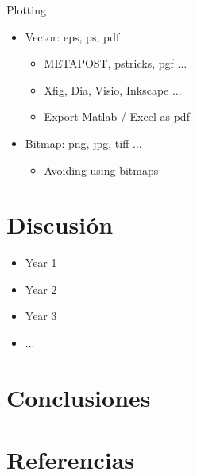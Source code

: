 \documentclass{beamer}
\begin{document}
\begin{frame}{Plotting}
    \begin{itemize}
        \item Vector: eps, ps, pdf
        \begin{itemize}
            \item METAPOST, pstricks, pgf $\ldots$
            \item Xfig, Dia, Visio, Inkscape $\ldots$
            \item Export Matlab / Excel as pdf
        \end{itemize}
        \item Bitmap: png, jpg, tiff $\ldots$
        \begin{itemize}
            \item Avoiding using bitmaps 
        \end{itemize}
    \end{itemize}

\end{frame}
\begin{frame}
  
\end{frame}

\section{Discusión}
\begin{frame}
    \begin{itemize}
        \item Year 1
        \item Year 2
        \item Year 3
        \item ...
    \end{itemize}
\end{frame}

\section{Conclusiones}

\begin{frame}

\end{frame}

\section{Referencias}

\begin{frame}[allowframebreaks]
    
    
\end{frame}
\end{document}
